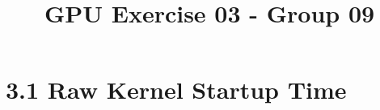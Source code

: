 \documentclass{report}
\begin{document}
\title{GPU Exercise 03 - Group 09}
\maketitle


\section*{3.1 Raw Kernel Startup Time}
 
\end{document}
